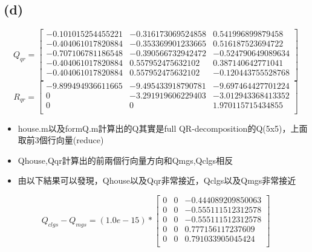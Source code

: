 \documentclass{article}
\begin{document}
        \subsection*{(d)}
            \begin{equation}
                Q_{qr} = \left[
                \begin{array}{ccc}
                    -0.101015254455221 & -0.316173069524858 &  0.541996899879458\\
                    -0.404061017820884 & -0.353369901233665 &  0.516187523694722\\
                    -0.707106781186548 & -0.390566732942472 & -0.524790649089634\\
                    -0.404061017820884 &  0.557952475632102 &  0.387140642771041\\
                    -0.404061017820884 &  0.557952475632102 & -0.120443755528768\\
                \end{array}
                \right]
            \end{equation}
            \begin{equation}
                R_{qr} = \left[    
                \begin{array}{ccc}
                    -9.899494936611665 & -9.495433918790781 & -9.697464427701224\\
                    0 & -3.291919606229403 & -3.012943368413352\\
                    0 &                  0 &  1.970115715434855\\
                \end{array}
                \right]
            \end{equation}
        \begin{itemize}
            \item house.m以及formQ.m計算出的Q其實是full QR-decomposition的Q(5x5)，上面取前3個行向量(reduce)
            \item Qhouse,Qqr計算出的前兩個行向量方向和Qmgs,Qclgs相反
            \item 由以下結果可以發現，Qhouse以及Qqr非常接近，Qclgs以及Qmgs非常接近
        \end{itemize}
            \begin{equation}
                Q_{clgs} - Q_{mgs} = (1.0e-15) * \left[
                \begin{array}{ccc}
                    0 &                  0 & -0.444089209850063\\
                    0 &                  0 & -0.555111512312578\\
                    0 &                  0 & -0.555111512312578\\
                    0 &                  0 &  0.777156117237609\\
                    0 &                  0 &  0.791033905045424\\
                \end{array}
                \right]
            \end{equation}
\end{document}
